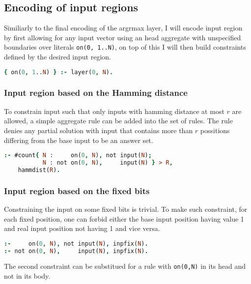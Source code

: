 \subsection{Encoding of input regions}

Similiarly to the final encoding of the argrmax layer, I will encode input region
by first allowing for any input vector using an head aggregate with unspecified boundaries
over literals \texttt{on(0, 1..N)}, on top of this I will then build constraints %
defined by the desired input region.

\begin{lstlisting}[language=Prolog, numbers=none]
{ on(0, 1..N) } :- layer(0, N).
\end{lstlisting}

\subsubsection{Input region based on the Hamming distance}

To constrain input such that only inputs with hamming distance at most $r$ are allowed,
a simple aggregate rule can be added into the set of rules.
The rule denies any partial solution with input that contains more than $r$ possitions
differing from the base input to be an answer set.

\begin{lstlisting}[language=Prolog, numbers=none]
:- #count{ N :     on(0, N), not input(N);
           N : not on(0, N),     input(N) } > R,
    hammdist(R).
\end{lstlisting}

\subsubsection{Input region based on the fixed bits}

Constraining the input on some fixed bits is trivial. To make such constraint,
for each fixed position, one can forbid either the base input position having value 1
and real input position not having 1 and vice versa.

\begin{lstlisting}[language=Prolog, numbers=none]
:-     on(0, N), not input(N), inpfix(N).
:- not on(0, N),     input(N), inpfix(N).
\end{lstlisting}

The second constraint can be substitued for a rule with \texttt{on(0,N)} %
in its head and not in its body.

